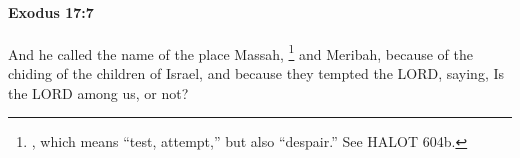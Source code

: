 
		\paragraph{Exodus 17:7} %
			\label{EXODUS-17-7}

			And he called the name of the place Massah,%
				\footnote{%
					, which means ``test, attempt,'' but also ``despair.'' See HALOT 604b.
					}
			and Meribah, because of the chiding of the children of Israel, and because they tempted the LORD, saying, Is the LORD among us, or not?


